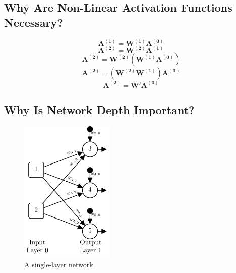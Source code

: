 \documentclass[xcolor={table}]{beamer}
\begin{document}
\subsection{Why Are Non-Linear Activation Functions Necessary?}

 \begin{frame} 
\begin{equation}
\mathbf{A^{(1)}}=\mathbf{W^{(1)}}\mathbf{A^{(0)}}
\label{eq:firstlayer}
\end{equation}
\begin{equation}
\mathbf{A^{(2)}}=\mathbf{W^{(2)}}\mathbf{A^{(1)}}
\label{eq:secondlayer}
\end{equation}
\begin{equation}
\mathbf{A^{(2)}}=\mathbf{W^{(2)}}\left(\mathbf{W^{(1)}}\mathbf{A^{(0)}}\right)
\label{eq:rewritesecondlayer}
\end{equation}
\begin{equation}
\mathbf{A^{(2)}}=\left(\mathbf{W^{(2)}}\mathbf{W^{(1)}}\right)\mathbf{A^{(0)}}
\label{eq:associativerewrite}
\end{equation}
\begin{equation}
\mathbf{A^{(2)}}=\mathbf{W'}\mathbf{A^{(0)}}
\label{eq:associativerewrite2}
\end{equation}
\end{frame} 

\subsection{Why Is Network Depth Important?}


 \begin{frame} 
\begin{figure}[t]
\centerline{
\includegraphics[width=0.4\textwidth]{./images/fmlpda_8_07.pdf}
}
\caption[A single-layer network.]{A single-layer network.}
\label{fig:perceptron}
\end{figure}
\end{frame} 
\end{document}
